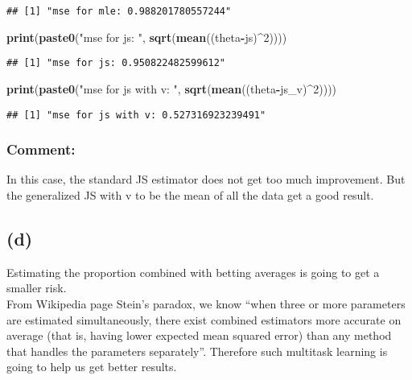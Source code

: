 \documentclass[]{article}
\newenvironment{Shaded}{\begin{snugshade}}{\end{snugshade}}
\newcommand{\KeywordTok}[1]{\textcolor[rgb]{0.13,0.29,0.53}{\textbf{#1}}}
\newcommand{\DecValTok}[1]{\textcolor[rgb]{0.00,0.00,0.81}{#1}}
\newcommand{\StringTok}[1]{\textcolor[rgb]{0.31,0.60,0.02}{#1}}
\newcommand{\OperatorTok}[1]{\textcolor[rgb]{0.81,0.36,0.00}{\textbf{#1}}}
\newcommand{\NormalTok}[1]{#1}
\begin{document}
\begin{verbatim}
## [1] "mse for mle: 0.988201780557244"
\end{verbatim}

\begin{Shaded}
\begin{Highlighting}[]
\KeywordTok{print}\NormalTok{(}\KeywordTok{paste0}\NormalTok{(}\StringTok{"mse for js: "}\NormalTok{, }\KeywordTok{sqrt}\NormalTok{(}\KeywordTok{mean}\NormalTok{((theta}\OperatorTok{-}\NormalTok{js)}\OperatorTok{^}\DecValTok{2}\NormalTok{))))}
\end{Highlighting}
\end{Shaded}

\begin{verbatim}
## [1] "mse for js: 0.950822482599612"
\end{verbatim}

\begin{Shaded}
\begin{Highlighting}[]
\KeywordTok{print}\NormalTok{(}\KeywordTok{paste0}\NormalTok{(}\StringTok{"mse for js with v: "}\NormalTok{, }\KeywordTok{sqrt}\NormalTok{(}\KeywordTok{mean}\NormalTok{((theta}\OperatorTok{-}\NormalTok{js_v)}\OperatorTok{^}\DecValTok{2}\NormalTok{))))}
\end{Highlighting}
\end{Shaded}

\begin{verbatim}
## [1] "mse for js with v: 0.527316923239491"
\end{verbatim}

\subsubsection{Comment:}\label{comment}

In this case, the standard JS estimator does not get too much
improvement. But the generalized JS with v to be the mean of all the
data get a good result.

\subsection{(d)}\label{d-1}

Estimating the proportion combined with betting averages is going to get
a smaller risk.\\
From Wikipedia page Stein's paradox, we know ``when three or more
parameters are estimated simultaneously, there exist combined estimators
more accurate on average (that is, having lower expected mean squared
error) than any method that handles the parameters separately''.
Therefore such multitask learning is going to help us get better
results.
\end{document}
